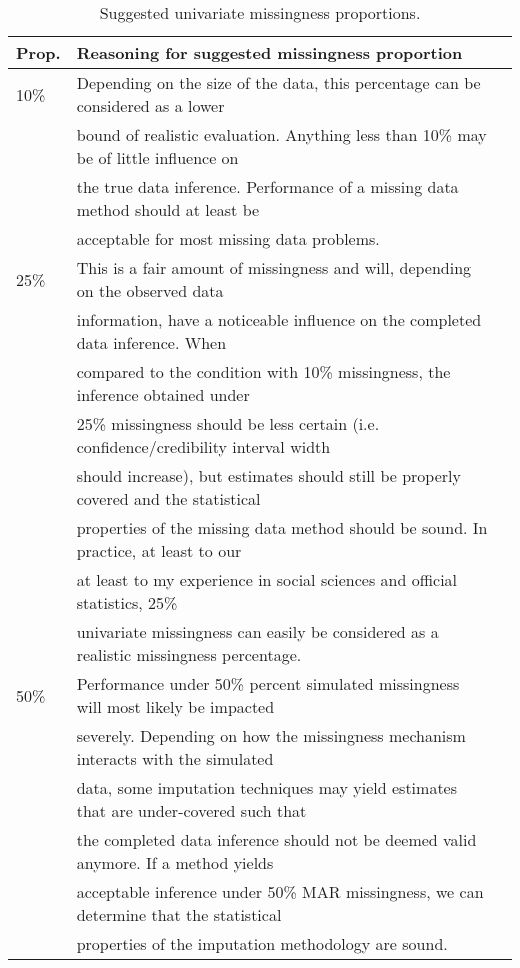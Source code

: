 \documentclass[bimj,fleqn]{w-art}
\begin{document}
\begin{table}[htb]
\begin{center}
\caption{Suggested univariate missingness proportions.}
\begin{tabular}{lll}
\hline
Prop. & Reasoning for suggested missingness proportion \\
\hline  
10\%  & Depending on the size of the data, this percentage can be considered as a lower \\
      & bound of realistic evaluation. Anything less than 10\% may be of little influence on \\
      & the true data inference. Performance of a missing data method should at least be \\
      & acceptable for most missing data problems. \\ %
25\%  & This is a fair amount of missingness and will, depending on the observed data \\
      & information, have a noticeable influence on the completed data inference. When \\
      & compared to the condition with 10\% missingness, the inference obtained under \\
      & 25\% missingness should be less certain (i.e. confidence/credibility interval width \\
      & should increase), but estimates should still be properly covered and the statistical \\
      & properties of the missing data method should be sound. In practice, at least to our \\
      & at least to my experience in social sciences and official statistics, 25\% \\
      & univariate missingness can easily be considered as a realistic missingness percentage. \\ %
50\%  & Performance under 50\% percent simulated missingness will most likely be impacted \\ 
      & severely. Depending on how the missingness mechanism interacts with the simulated \\
      & data, some imputation techniques may yield estimates that are under-covered such that \\
      & the completed data inference should not be deemed valid anymore. If a method yields \\
      & acceptable inference under 50\% MAR missingness, we can determine that the statistical \\
      & properties of the imputation methodology are sound. \\
\hline
\end{tabular}
\end{center}
\end{table}
\end{document}
